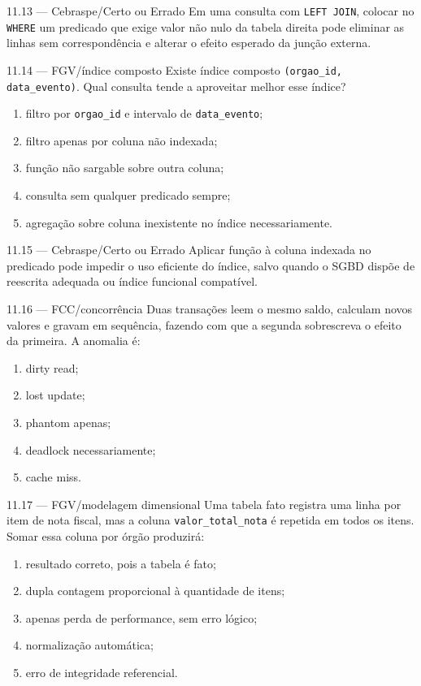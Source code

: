 \begin{questao}{ 11.13 — Cebraspe/Certo ou Errado}
Em uma consulta com \texttt{LEFT JOIN}, colocar no \texttt{WHERE} um predicado que exige valor não nulo da tabela direita pode eliminar as linhas sem correspondência e alterar o efeito esperado da junção externa.
\end{questao}

\begin{questao}{ 11.14 — FGV/índice composto}
Existe índice composto \texttt{(orgao\_id, data\_evento)}. Qual consulta tende a aproveitar melhor esse índice?
\begin{enumerate}[label=\Alph*)]
\item filtro por \texttt{orgao\_id} e intervalo de \texttt{data\_evento};
\item filtro apenas por coluna não indexada;
\item função não sargable sobre outra coluna;
\item consulta sem qualquer predicado sempre;
\item agregação sobre coluna inexistente no índice necessariamente.
\end{enumerate}
\end{questao}

\begin{questao}{ 11.15 — Cebraspe/Certo ou Errado}
Aplicar função à coluna indexada no predicado pode impedir o uso eficiente do índice, salvo quando o SGBD dispõe de reescrita adequada ou índice funcional compatível.
\end{questao}

\begin{questao}{ 11.16 — FCC/concorrência}
Duas transações leem o mesmo saldo, calculam novos valores e gravam em sequência, fazendo com que a segunda sobrescreva o efeito da primeira. A anomalia é:
\begin{enumerate}[label=\Alph*)]
\item dirty read;
\item lost update;
\item phantom apenas;
\item deadlock necessariamente;
\item cache miss.
\end{enumerate}
\end{questao}

\begin{questao}{ 11.17 — FGV/modelagem dimensional}
Uma tabela fato registra uma linha por item de nota fiscal, mas a coluna \texttt{valor\_total\_nota} é repetida em todos os itens. Somar essa coluna por órgão produzirá:
\begin{enumerate}[label=\Alph*)]
\item resultado correto, pois a tabela é fato;
\item dupla contagem proporcional à quantidade de itens;
\item apenas perda de performance, sem erro lógico;
\item normalização automática;
\item erro de integridade referencial.
\end{enumerate}
\end{questao}

